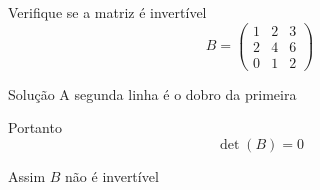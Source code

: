 \begin{question}
  Verifique se a matriz é invertível
  \[
    B =
    \begin{pmatrix}
      1 & 2 & 3 \\
      2 & 4 & 6 \\
      0 & 1 & 2
    \end{pmatrix}
  \]
\end{question}

\begin{resolution}{Solução}
  A segunda linha é o dobro da primeira

  \pause
  Portanto
  \[
    \det(B) = 0
  \]

  \pause
  Assim
  \(B\) não é invertível
\end{resolution}

\endinput
